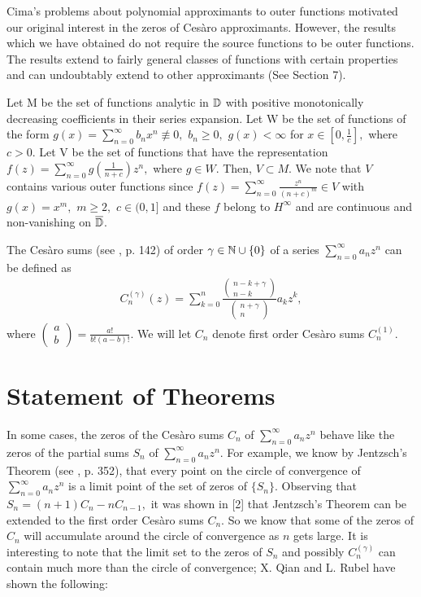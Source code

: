 \documentclass[final]{siamltex}
\begin{document}
Cima's problems about polynomial approximants to outer functions motivated our original interest in the zeros of Ces\`{a}ro approximants.  However, the results which we have obtained do not require the source functions to be outer functions. The results  extend to fairly general classes of functions with certain properties and can undoubtably extend to other approximants (See Section 7).

Let M be the set of functions analytic in ${\Bbb D}$ with positive monotonically decreasing coefficients in their series expansion.  Let W be the set of functions of the form $g(x) = \sum_{n=0}^{\infty}b_{n}x^{n} \not\equiv 0,$ $b_{n} \geq 0,$ $g(x) < \infty$ for $x \in [0, \frac{1}{c}],$ where $c > 0.$  Let V be the set of functions that have the representation $ f(z) = \sum_{n=0}^{\infty} g \left( \frac{1}{n+c} \right) z^{n},$ where $g \in {W}.$  Then, $V \subset M$.  We note that $V$ contains various outer functions since $f(z) = \sum_{n=0}^{\infty} \frac{z^{n}}{(n+c)^{m}} \in V$ with $g(x) = x^{m},$ $m \geq 2,$ $c \in (0,1]$ and these $f$ belong to  ${H}^{\infty}$ and are continuous and non-vanishing on $\overline{{\Bbb D}}$. 
 

 The Ces\`{a}ro sums (see \cite{rus}, p. 142) of order $\gamma \in {\Bbb N} \cup \{0\}$ of a series $\sum_{n=0}^{\infty}a_{n}z^{n}$ can be  defined as  
  \begin{eqnarray*} C_{n}^{(\gamma)}(z) = \sum_{k=0}^{n} \frac{ \left( \begin{array}{c} n - k + \gamma \\ n - k \end{array} \right) } { \left( \begin{array}{c} n + \gamma \\ n \end{array} \right) } a_{k}z^{k},
 \end{eqnarray*}
 where $ \left( \begin{array}{c} a \\ b \end{array} \right) = \displaystyle{\frac{a!}{b!(a-b)!}}.$  We will let $C_n$ denote first order Ces\`{a}ro sums $C_n^{(1)}$.

\section{Statement of Theorems}

  In some cases, the zeros of the Ces\`{a}ro sums $C_{n}$ of $\sum_{n=0}^{\infty} a_{n}z^{n}$ behave like the zeros of the partial sums $S_{n}$ of $\sum_{n=0}^{\infty} a_{n}z^{n}.$ For example, we know by Jentzsch's Theorem (see \cite{die}, p. 352), that every point on the circle of convergence of $\sum_{n=0}^{\infty} a_{n}z^{n}$ is a limit point of the set of zeros of $ \{S_{n} \}.$ 
Observing that $S_{n} = (n+1)C_{n} -  nC_{n-1},$ it was shown in [2] that Jentzsch's Theorem can be extended to the first order Ces\`{a}ro sums $C_{n}$. 
 So we know that some of the zeros of $C_{n}$ will accumulate around the circle of convergence as $n$ gets large. It is interesting to note that the limit set to the zeros of $S_{n}$ and possibly $C_{n}^{(\gamma)}$ can contain much more than the circle of convergence; X. Qian and L. Rubel \cite{rub} have shown the following: 
\end{document}
